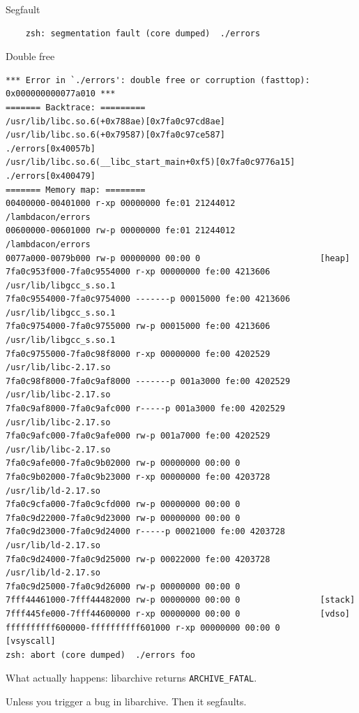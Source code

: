 \documentclass{beamer}
\begin{document}
\begin{frame}[fragile]{Segfault}
  \begin{verbatim}
    zsh: segmentation fault (core dumped)  ./errors
  \end{verbatim}
\end{frame}

\begin{frame}[fragile]{Double free}
  \begin{verbatim}
*** Error in `./errors': double free or corruption (fasttop): 0x000000000077a010 ***
======= Backtrace: =========
/usr/lib/libc.so.6(+0x788ae)[0x7fa0c97cd8ae]
/usr/lib/libc.so.6(+0x79587)[0x7fa0c97ce587]
./errors[0x40057b]
/usr/lib/libc.so.6(__libc_start_main+0xf5)[0x7fa0c9776a15]
./errors[0x400479]
======= Memory map: ========
00400000-00401000 r-xp 00000000 fe:01 21244012                 /lambdacon/errors
00600000-00601000 rw-p 00000000 fe:01 21244012                 /lambdacon/errors
0077a000-0079b000 rw-p 00000000 00:00 0                        [heap]
7fa0c953f000-7fa0c9554000 r-xp 00000000 fe:00 4213606          /usr/lib/libgcc_s.so.1
7fa0c9554000-7fa0c9754000 -------p 00015000 fe:00 4213606          /usr/lib/libgcc_s.so.1
7fa0c9754000-7fa0c9755000 rw-p 00015000 fe:00 4213606          /usr/lib/libgcc_s.so.1
7fa0c9755000-7fa0c98f8000 r-xp 00000000 fe:00 4202529          /usr/lib/libc-2.17.so
7fa0c98f8000-7fa0c9af8000 -------p 001a3000 fe:00 4202529          /usr/lib/libc-2.17.so
7fa0c9af8000-7fa0c9afc000 r-----p 001a3000 fe:00 4202529          /usr/lib/libc-2.17.so
7fa0c9afc000-7fa0c9afe000 rw-p 001a7000 fe:00 4202529          /usr/lib/libc-2.17.so
7fa0c9afe000-7fa0c9b02000 rw-p 00000000 00:00 0
7fa0c9b02000-7fa0c9b23000 r-xp 00000000 fe:00 4203728          /usr/lib/ld-2.17.so
7fa0c9cfa000-7fa0c9cfd000 rw-p 00000000 00:00 0
7fa0c9d22000-7fa0c9d23000 rw-p 00000000 00:00 0
7fa0c9d23000-7fa0c9d24000 r-----p 00021000 fe:00 4203728          /usr/lib/ld-2.17.so
7fa0c9d24000-7fa0c9d25000 rw-p 00022000 fe:00 4203728          /usr/lib/ld-2.17.so
7fa0c9d25000-7fa0c9d26000 rw-p 00000000 00:00 0
7fff44461000-7fff44482000 rw-p 00000000 00:00 0                [stack]
7fff445fe000-7fff44600000 r-xp 00000000 00:00 0                [vdso]
ffffffffff600000-ffffffffff601000 r-xp 00000000 00:00 0        [vsyscall]
zsh: abort (core dumped)  ./errors foo
\end{verbatim}
\end{frame}

\begin{frame}
  What actually happens: libarchive returns \texttt{ARCHIVE\_FATAL}.\pause

  Unless you trigger a bug in libarchive. \pause
  \alert{Then it segfaults.}
\end{frame}
\end{document}

